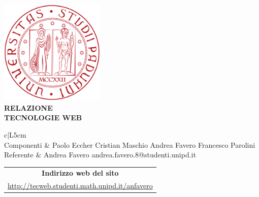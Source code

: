 \documentclass[10pt, a4paper]{article}
\makeatletter
\newcommand{\Componenti}{Paolo Eccher \newline Cristian Maschio \newline
	Andrea Favero \newline Francesco Parolini}
\newcommand{\Referente}{Andrea Favero \newline andrea.favero.8@studenti.unipd.it}
\makeatother
\begin{document}
\begin{titlepage}
\centering

\includegraphics[width=50mm]{Images/logo.png}
\vspace*{32px}
{\Large \\ \textbf{RELAZIONE}\\}
\vspace*{2px}
{\Large \textbf{TECNOLOGIE WEB}\\}
\vspace*{27px}

\bgroup
\def\arraystretch{1.3}
\centering
\begin{tabular}{c|L{5cm}}
 \\ \hline
  Componenti & \Componenti{} \\
  Referente & \Referente{}
\end{tabular}
\egroup

\vspace*{8px}

\bgroup
\def\arraystretch{1.3}
\centering
\begin{tabular}{c}
\multicolumn{1}{c}{\textbf{Indirizzo web del sito} } \\
  \url{http://tecweb.studenti.math.unipd.it/anfavero}
\end{tabular}
\egroup

\vspace*{10px}


\end{titlepage}
\end{document}
